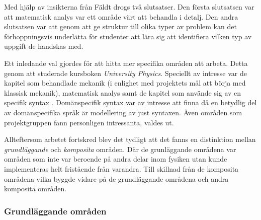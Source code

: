 \begin{draft}
Med hjälp av insikterna från Fäldt drogs två slutsatser. Den första slutsatsen
var att matematisk analys var ett område värt att behandla i detalj. Den andra
slutsatsen var att genom att ge struktur till olika typer av problem kan det
förhoppningsvis underlätta för studenter att lära sig att identifiera vilken
typ av uppgift de handskas med.

Ett inledande val gjordes för att hitta mer specifika områden att arbeta.
Detta genom att studerade kursboken \textit{University Physics}.
Speciellt av intresse var de kapitel som behandlade mekanik (i enlighet med
projektets mål att börja med klassisk mekanik), matematisk analys samt de
kapitel som använde sig av en specifik syntax . Domänspecifik
syntax var av intresse att finna då en betydlig del av domänspecifika språk är
modellering av just syntaxen.  Även områden som projektgruppen fann personligen intressanta,
valdes ut.

Allteftersom arbetet fortskred blev det tydligt att det fanns en distinktion
mellan \textit{grundläggande} och \textit{komposita} områden.  Där de
grunläggande områdena var områden som inte var beroende på andra delar inom fysiken
utan kunde implementeras helt fristående från varandra. Till skillnad från de
komposita områdena vilka byggde vidare på de grundläggande områdena och andra
komposita områden.

\end{draft}

\subsubsection*{Grundläggande områden}


